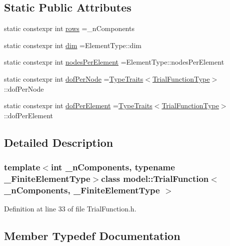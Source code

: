 \subsection*{Static Public Attributes}
\begin{DoxyCompactItemize}
\item 
static constexpr int \hyperlink{classmodel_1_1_trial_function_a1d4b756e358d5dbf7cc9464bc6bb37a8}{rows} =\+\_\+n\+Components
\item 
static constexpr int \hyperlink{classmodel_1_1_trial_function_a52ad09fcd425a06951e5c917eda26a7f}{dim} =Element\+Type\+::dim
\item 
static constexpr int \hyperlink{classmodel_1_1_trial_function_a88ce10c7d07ae2ce3d8f3c7342f55c26}{nodes\+Per\+Element} =Element\+Type\+::nodes\+Per\+Element
\item 
static constexpr int \hyperlink{classmodel_1_1_trial_function_ad23735e6005fbc863c2f722f343c15e4}{dof\+Per\+Node} =\hyperlink{structmodel_1_1_type_traits}{Type\+Traits}$<$\hyperlink{classmodel_1_1_trial_function_a7f044ad0cacd2e9026ea7a3861e0df9a}{Trial\+Function\+Type}$>$\+::dof\+Per\+Node
\item 
static constexpr int \hyperlink{classmodel_1_1_trial_function_a2c8f1a6d813250a57c722223f5d1fcab}{dof\+Per\+Element} =\hyperlink{structmodel_1_1_type_traits}{Type\+Traits}$<$\hyperlink{classmodel_1_1_trial_function_a7f044ad0cacd2e9026ea7a3861e0df9a}{Trial\+Function\+Type}$>$\+::dof\+Per\+Element
\end{DoxyCompactItemize}


\subsection{Detailed Description}
\subsubsection*{template$<$int \+\_\+n\+Components, typename \+\_\+\+Finite\+Element\+Type$>$class model\+::\+Trial\+Function$<$ \+\_\+n\+Components, \+\_\+\+Finite\+Element\+Type $>$}



Definition at line 33 of file Trial\+Function.\+h.



\subsection{Member Typedef Documentation}
\hypertarget{classmodel_1_1_trial_function_af4bd713419cc83660594065c9392bf2c}{}
